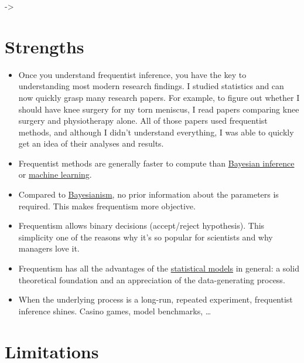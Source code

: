 \documentclass[
  10pt,
]{scrbook}
\providecommand{\tightlist}{%
  \setlength{\itemsep}{0pt}\setlength{\parskip}{0pt}}
\begin{document}
-\textgreater{}

\hypertarget{strengths-1}{%
\section{Strengths}\label{strengths-1}}

\begin{itemize}
\tightlist
\item
  Once you understand frequentist inference, you have the key to understanding most modern research findings. I studied statistics and can now quickly grasp many research papers. For example, to figure out whether I should have knee surgery for my torn meniscus, I read papers comparing knee surgery and physiotherapy alone. All of those papers used frequentist methods, and although I didn't understand everything, I was able to quickly get an idea of their analyses and results.
\item
  Frequentist methods are generally faster to compute than \protect\hyperlink{bayesian}{Bayesian inference} or \protect\hyperlink{supervised-ml}{machine learning}.
\item
  Compared to \protect\hyperlink{bayesian}{Bayesianism}, no prior information about the parameters is required. This makes frequentism more objective.
\item
  Frequentism allows binary decisions (accept/reject hypothesis). This simplicity one of the reasons why it's so popular for scientists and why managers love it.
\item
  Frequentism has all the advantages of the \protect\hyperlink{statistical-modeling}{statistical models} in general: a solid theoretical foundation and an appreciation of the data-generating process.
\item
  When the underlying process is a long-run, repeated experiment, frequentist inference shines. Casino games, model benchmarks, \ldots{}
\end{itemize}

\hypertarget{limitations-1}{%
\section{Limitations}\label{limitations-1}}
\end{document}
